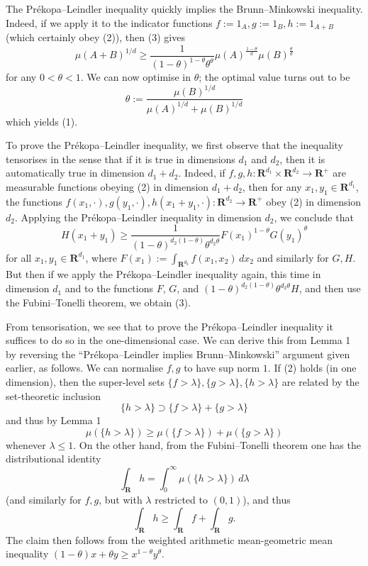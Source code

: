 The Pr\'ekopa--Leindler inequality quickly implies the Brunn--Minkowski inequality. Indeed, if we apply it to the indicator functions $f:=1_A,g:=1_B,h:=1_{A+B}$ (which certainly obey (2)), then (3) gives
\[
\mu(A+B)^{1/d}\geq
\frac{1}{(1-\theta)^{1-\theta}\theta^\theta}
\mu(A)^{\frac{1-\theta}{d}}\mu(B)^{\frac{\theta}{d}}
\]
for any $0<\theta<1$. We can now optimise in $\theta$; the optimal value turns out to be
\[
\theta:=\frac{\mu(B)^{1/d}}{\mu(A)^{1/d}+\mu(B)^{1/d}}
\]
which yields (1).

To prove the Pr\'ekopa--Leindler inequality, we first observe that the inequality tensorises in the sense that if it is true in dimensions $d_1$ and $d_2$, then it is automatically true in dimension $d_1+d_2$. Indeed, if $f,g,h:\mathbf R^{d_1}\times\mathbf R^{d_2}\to\mathbf R^+$ are measurable functions obeying (2) in dimension $d_1+d_2$, then for any $x_1,y_1\in\mathbf R^{d_1}$, the functions $f(x_1,\cdot),g(y_1,\cdot),h(x_1+y_1,\cdot):\mathbf R^{d_2}\to\mathbf R^+$ obey (2) in dimension $d_2$. Applying the Pr\'ekopa--Leindler inequality in dimension $d_2$, we conclude that
\[
H(x_1+y_1)\geq
\frac{1}{(1-\theta)^{d_2(1-\theta)}\theta^{d_2\theta}}
F(x_1)^{1-\theta}G(y_1)^\theta
\]
for all $x_1,y_1\in\mathbf R^{d_1}$, where $F(x_1):=\int_{\mathbf R^{d_2}}f(x_1,x_2)\,dx_2$ and similarly for $G,H$. But then if we apply the Pr\'ekopa--Leindler inequality again, this time in dimension $d_1$ and to the functions $F$, $G$, and $(1-\theta)^{d_2(1-\theta)}\theta^{d_2\theta}H$, and then use the Fubini--Tonelli theorem, we obtain (3).

From tensorisation, we see that to prove the Pr\'ekopa--Leindler inequality it suffices to do so in the one-dimensional case. We can derive this from Lemma 1 by reversing the ``Pr\'ekopa--Leindler implies Brunn--Minkowski'' argument given earlier, as follows. We can normalise $f,g$ to have sup norm $1$. If (2) holds (in one dimension), then the super-level sets $\{f>\lambda\},\{g>\lambda\},\{h>\lambda\}$ are related by the set-theoretic inclusion
\[
\{h>\lambda\}\supset\{f>\lambda\}+\{g>\lambda\}
\]
and thus by Lemma 1
\[
\mu(\{h>\lambda\})\geq\mu(\{f>\lambda\})+\mu(\{g>\lambda\})
\]
whenever $\lambda\leq1$. On the other hand, from the Fubini--Tonelli theorem one has the distributional identity
\[
\int_{\mathbf R}h=\int_0^\infty\mu(\{h>\lambda\})\,d\lambda
\]
(and similarly for $f,g$, but with $\lambda$ restricted to $(0,1)$), and thus
\[
\int_{\mathbf R}h\geq\int_{\mathbf R}f+\int_{\mathbf R}g.
\]
The claim then follows from the weighted arithmetic mean-geometric mean inequality $(1-\theta)x+\theta y\geq x^{1-\theta}y^\theta$.
